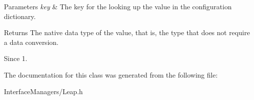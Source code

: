 \begin{DoxyParams}{Parameters}
{\em key} & The key for the looking up the value in the configuration dictionary. \\
\hline
\end{DoxyParams}
\begin{DoxyReturn}{Returns}
The native data type of the value, that is, the type that does not require a data conversion. 
\end{DoxyReturn}
\begin{DoxySince}{Since}
1. 
\end{DoxySince}


The documentation for this class was generated from the following file\+:\begin{DoxyCompactItemize}
\item 
Interface\+Managers/Leap.\+h\end{DoxyCompactItemize}
